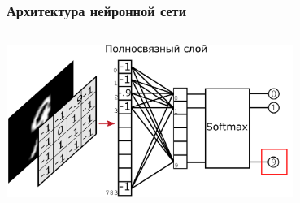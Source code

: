 \begin{frame}
\frametitle{Архитектура нейронной сети}
\begin{columns}[T]
    
    \begin{block}{}%
        \vspace{1mm}
        \centering \includegraphics[width = 0.7\textwidth]{pics/nn_2.png}
    \end{block}        

    \vspace{-2mm}
        
\end{columns}
\end{frame}
